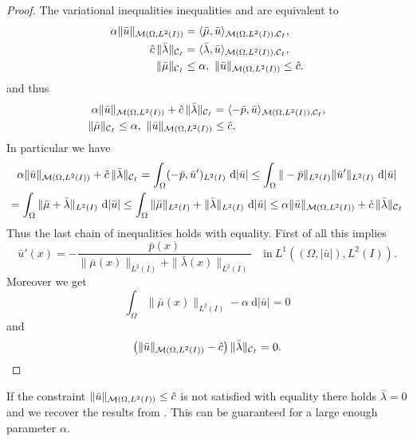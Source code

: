 \begin{proof}
The variational inequalities inequalities \label{var ineq mu} and \label{var ineq lambda} are equivalent to 
\begin{align*}
\alpha\|\bar u\|_{\mathcal{M}(\Omega, L^{2}(I))}&=\langle \bar\mu,\bar u\rangle_{\mathcal{M}(\Omega, L^{2}(I)),\mathcal{C}_I},\\
\hat c\,\|\bar\lambda\|_{\mathcal{C}_I}&=\langle \bar\lambda,\bar u\rangle_{\mathcal{M}(\Omega, L^{2}(I)),\mathcal{C}_I},\\
\|\bar \mu\|_{\mathcal{C}_I}&\leq\alpha,~\|\bar u\|_{\mathcal{M}(\Omega, L^{2}(I))}\leq \hat c.
\end{align*}
and thus 
\begin{align*}
\alpha\|\bar u\|_{\mathcal{M}(\Omega, L^{2}(I))}+\hat c\,\|\bar\lambda\|_{\mathcal{C}_I}&=\langle -\bar p,\bar u\rangle_{\mathcal{M}(\Omega, L^{2}(I)),\mathcal{C}_I},\\
\|\bar \mu\|_{\mathcal{C}_I}\leq\alpha,~\|\bar u\|_{\mathcal{M}(\Omega, L^{2}(I))}&\leq \hat c.
\end{align*}
In particular we have
\begin{multline*}
\alpha\|\bar u\|_{\mathcal{M}(\Omega, L^{2}(I))}+\hat c\,\|\bar\lambda\|_{\mathcal{C}_I}= \int_\Omega(-\bar p,\bar u')_{L^2(I)}~\mathrm d|\bar u|
\leq \int_\Omega\|-\bar p\|_{L^2(I)}\|\bar u'\|_{L^2(I)}~\mathrm d|\bar u|\\
= \int_\Omega\|\bar\mu+\bar\lambda\|_{L^2(I)}~\mathrm d|\bar u|
\leq\int_\Omega\|\bar\mu\|_{L^2(I)}+\|\bar\lambda\|_{L^2(I)}~\mathrm d|\bar u|
\leq\alpha\|\bar u\|_{\mathcal{M}(\Omega, L^{2}(I))}+\hat c\,\|\bar\lambda\|_{\mathcal{C}_I}
\end{multline*}
Thus the last chain of inequalities holds with equality. First of all this implies
\[
\bar u'(x)=-\frac{\bar p(x)}{\|\bar \mu(x)\|_{L^2(I)}+\|\bar\lambda(x)\|_{L^2(I)}}\quad\text{in}~L^1((\Omega,|\bar u|),L^2(I)).
\]
Moreover we get
\[
\int_\Omega\|\bar \mu(x)\|_{L^2(I)}-\alpha~\mathrm d|\bar u|=0
\]
and
\[
\left(\|\bar u\|_{\mathcal{M}(\Omega, L^{2}(I))}-\hat c\right)\|\bar\lambda\|_{\mathcal{C}_I}=0.
\]
\end{proof}
\begin{rmk}
If the constraint $\|\bar u\|_{\mathcal{M}(\Omega, L^{2}(I))}\leq \hat c$ is not satisfied with equality there holds $\bar \lambda=0$ and we recover the results from \cite{pieper2014}. This can be guaranteed for a large enough parameter $\alpha$.
\end{rmk}
%


